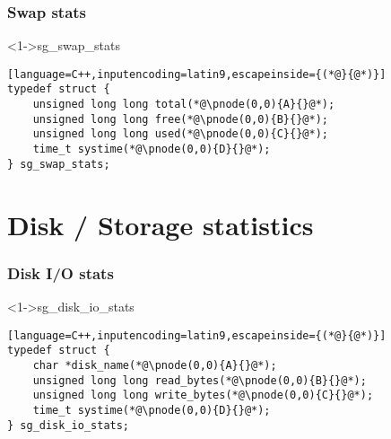 \documentclass[ngerman,xcolor={table,dvipsnames},smaller,compress,hyperref={bookmarks,colorlinks}]{beamer}
\begin{document}
\begin{frame}[fragile]
\frametitle{Swap stats}
\begin{block}<1->{sg\_swap\_stats}
\tiny
\begin{lstlisting}[language=C++,inputencoding=latin9,escapeinside={(*@}{@*)}]
typedef struct {
    unsigned long long total(*@\pnode(0,0){A}{}@*);
    unsigned long long free(*@\pnode(0,0){B}{}@*);
    unsigned long long used(*@\pnode(0,0){C}{}@*);
    time_t systime(*@\pnode(0,0){D}{}@*);
} sg_swap_stats;
\end{lstlisting}
\end{block}

\scriptsize
\begin{itemize}
\end{itemize}
\end{frame}

\section{Disk / Storage statistics}

\begin{frame}[fragile]
\frametitle{Disk I/O stats}
\begin{block}<1->{sg\_disk\_io\_stats}
\tiny
\begin{lstlisting}[language=C++,inputencoding=latin9,escapeinside={(*@}{@*)}]
typedef struct {
    char *disk_name(*@\pnode(0,0){A}{}@*);
    unsigned long long read_bytes(*@\pnode(0,0){B}{}@*);
    unsigned long long write_bytes(*@\pnode(0,0){C}{}@*);
    time_t systime(*@\pnode(0,0){D}{}@*);
} sg_disk_io_stats;
\end{lstlisting}
\end{block}

\scriptsize
{}
\begin{itemize}
\end{itemize}
\end{frame}
\end{document}
